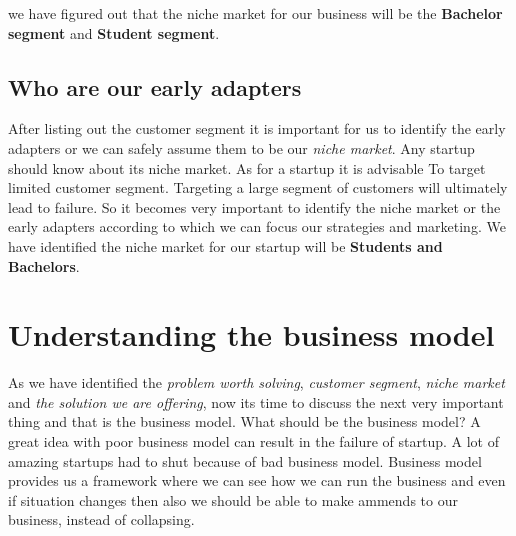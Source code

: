\documentclass[a4paper, 12pt]{article}
\begin{document}
we have figured out that the niche market for our business will be the \textbf{Bachelor segment} and \textbf{Student segment}.
\subsection{Who are our early adapters}
After listing out the customer segment it is important for us to identify the early adapters or we can safely assume them
to be our \textit{niche market}. Any startup should know about its niche market. As for a startup it is advisable To
target limited customer segment. Targeting a large segment of customers will ultimately lead to failure. So it becomes
very important to identify the niche market or the early adapters according to which we can focus our strategies and
marketing. We have identified the niche market for our startup will be \textbf{Students and Bachelors}.

\section*{Understanding the business model}
As we have identified the \textit{problem worth solving}, \textit{customer segment}, \textit{niche market} and
\textit{the solution we are offering}, now its time to discuss the next very important thing and that is the business 
model. What should be the business model? A great idea with poor business model can result in the failure of 
startup. A lot of amazing startups had to shut because of bad business model. Business model provides us a framework
where we can see how we can run the business and even if situation changes then also we should be able to make
ammends to our business, instead of collapsing.
\end{document}

